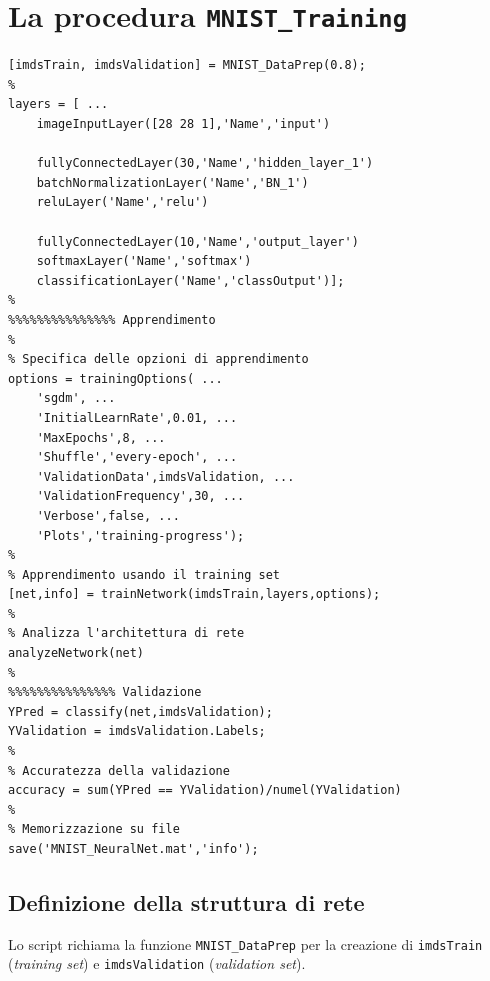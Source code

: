 \documentclass[a4paper,12pt]{article}
\begin{document}
\newpage
\section{La procedura \texttt{MNIST\_Training}} %

\begin{lstlisting}[style=Matlab-editor,title=\texttt{MNIST\_Training.m},label=lst:training]
[imdsTrain, imdsValidation] = MNIST_DataPrep(0.8);
%
layers = [ ...
    imageInputLayer([28 28 1],'Name','input')

    fullyConnectedLayer(30,'Name','hidden_layer_1')
    batchNormalizationLayer('Name','BN_1')
    reluLayer('Name','relu')
   
    fullyConnectedLayer(10,'Name','output_layer')
    softmaxLayer('Name','softmax')
    classificationLayer('Name','classOutput')];
%
%%%%%%%%%%%%%%% Apprendimento
%
% Specifica delle opzioni di apprendimento
options = trainingOptions( ...
    'sgdm', ...
    'InitialLearnRate',0.01, ...
    'MaxEpochs',8, ...
    'Shuffle','every-epoch', ...
    'ValidationData',imdsValidation, ...
    'ValidationFrequency',30, ...
    'Verbose',false, ...
    'Plots','training-progress');
%
% Apprendimento usando il training set
[net,info] = trainNetwork(imdsTrain,layers,options);
%
% Analizza l'architettura di rete
analyzeNetwork(net)
%
%%%%%%%%%%%%%%% Validazione
YPred = classify(net,imdsValidation);
YValidation = imdsValidation.Labels;
%
% Accuratezza della validazione
accuracy = sum(YPred == YValidation)/numel(YValidation)
%
% Memorizzazione su file
save('MNIST_NeuralNet.mat','info');
\end{lstlisting}


\subsection{Definizione della struttura di rete}
Lo script richiama la funzione \texttt{MNIST\_DataPrep} per la creazione di \texttt{imdsTrain} (\emph{training set}) e \texttt{imdsValidation} (\emph{validation set}).
\end{document}
